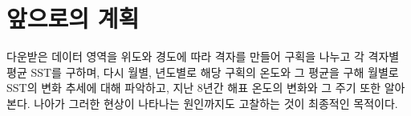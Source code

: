
\section{앞으로의 계획}

다운받은 데이터 영역을 위도와 경도에 따라 격자를 만들어 구획을 나누고 각 격자별 평균 SST를 구하며, 다시 월별, 년도별로 해당 구획의 온도와 그 평균을 구해 월별로 SST의 변화 추세에 대해 파악하고, 지난 8년간 해표 온도의 변화와 그 주기 또한 알아본다. 나아가 그러한 현상이 나타나는 원인까지도 고찰하는 것이 최종적인 목적이다. 